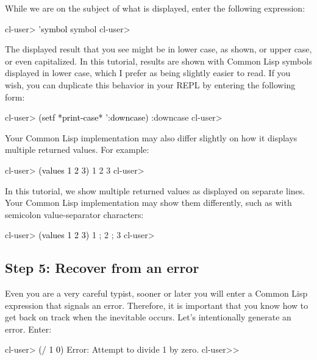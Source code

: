 \documentclass[10pt,twoside,english,pdftex]{article}
\begin{document}
%
While we are on the subject of what is displayed, enter the following
expression:
%
\W\supp
\begin{example}
\textcolor{darkergray}{%
  cl-user> \textcolor{black}{'symbol}
  symbol
  cl-user>}
\end{example}
%
The displayed result that you see might be in lower case, as shown, or upper
case, or even capitalized.  In this tutorial, results are shown with Common
Lisp symbols displayed in lower case, which I prefer as being slightly easier
to read.  If you wish, you can duplicate this behavior in your REPL by
entering the following form:
%
\W\supp\notpretop
\begin{example}
\textcolor{darkergray}{%
  cl-user> \textcolor{black}{(setf *print-case* ':downcase)}
  :downcase
  cl-user>}
\end{example}

%
Your Common Lisp implementation may also differ slightly on how it displays
multiple returned values.  For example:
%
\W\supp
\begin{example}
\textcolor{darkergray}{%
  cl-user> \textcolor{black}{(values 1 2 3)}
  1
  2
  3
  cl-user>}
\end{example}

In this tutorial, we show multiple returned values as displayed on separate
lines.  Your Common Lisp implementation may show them differently, such as
with semicolon value-separator characters:
%
\W\supp
\begin{example}
\textcolor{darkergray}{%
  cl-user> \textcolor{black}{(values 1 2 3)}
  1 ;
  2 ;
  3
  cl-user>}
\end{example}

\subsection*{Step 5: Recover from an error}

%
%
Even you are a very careful typist, sooner or later you will enter a Common
Lisp expression that signals an error.  Therefore, it is important that you
know how to get back on track when the inevitable occurs.  Let's intentionally
generate an error.  Enter:
%
\W\supp
\begin{example}
\textcolor{darkergray}{%
  cl-user> \textcolor{black}{(/ 1 0)}
  Error: Attempt to divide 1 by zero.
  cl-user>>}
\end{example}
\end{document}
